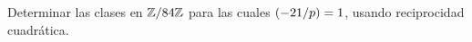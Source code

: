 \begin{ejerEcuacion}
	Determinar las clases en $\Enterosmod[84]$ para las cuales
	$\tlegendre{-21} p=1$, usando reciprocidad cuadr\'atica.
\end{ejerEcuacion}


